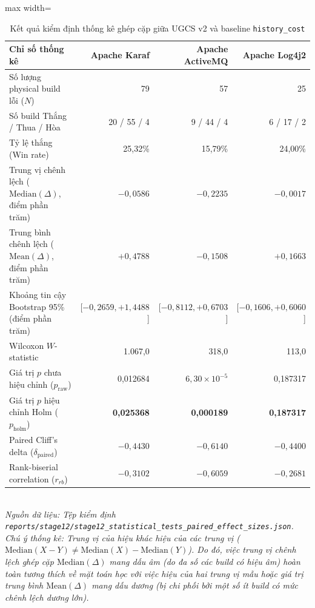 \begin{table}[H]
\centering
\caption{Kết quả kiểm định thống kê ghép cặp giữa UGCS v2 và baseline \texttt{history\_cost}}
\label{tab:stage12_comprehensive}
\begin{adjustbox}{max width=\textwidth}
\small
\begin{tabular}{lrrr}
\toprule
\textbf{Chỉ số thống kê} & \textbf{Apache Karaf} & \textbf{Apache ActiveMQ} & \textbf{Apache Log4j2} \\
\midrule
Số lượng physical build lỗi ($N$) & 79 & 57 & 25 \\
Số build Thắng / Thua / Hòa & 20 / 55 / 4 & 9 / 44 / 4 & 6 / 17 / 2 \\
Tỷ lệ thắng (Win rate) & 25,32\% & 15,79\% & 24,00\% \\
\midrule
Trung vị chênh lệch ($\text{Median}(\Delta)$, điểm phần trăm) & \textbf{$-0,0586$} & \textbf{$-0,2235$} & \textbf{$-0,0017$} \\
Trung bình chênh lệch ($\text{Mean}(\Delta)$, điểm phần trăm)   & \textbf{$+0,4788$} & \textbf{$-0,1508$} & \textbf{$+0,1663$} \\
Khoảng tin cậy Bootstrap 95\% (điểm phần trăm) & [$-0,2659, +1,4488$] & [$-0,8112, +0,6703$] & [$-0,1606, +0,6060$] \\
\midrule
Wilcoxon $W$-statistic & 1.067,0 & 318,0 & 113,0 \\
Giá trị $p$ chưa hiệu chỉnh ($p_{\text{raw}}$) & 0,012684 & $6,30 \times 10^{-5}$ & 0,187317 \\
Giá trị $p$ hiệu chỉnh Holm ($p_{\text{holm}}$) & \textbf{0,025368} & \textbf{0,000189} & \textbf{0,187317} \\
\midrule
Paired Cliff's delta ($\delta_{\text{paired}}$) & \textbf{$-0,4430$} & \textbf{$-0,6140$} & \textbf{$-0,4400$} \\
Rank-biserial correlation ($r_{rb}$) & \textbf{$-0,3102$} & \textbf{$-0,6059$} & \textbf{$-0,2681$} \\
\bottomrule
\end{tabular}
\end{adjustbox}
\vspace{1mm}\\
\footnotesize{\textit{Nguồn dữ liệu: Tệp kiểm định \texttt{reports/stage12/stage12\_statistical\_tests\_paired\_effect\_sizes.json}. Chú ý thống kê: Trung vị của hiệu khác hiệu của các trung vị ($\text{Median}(X - Y) \neq \text{Median}(X) - \text{Median}(Y)$). Do đó, việc trung vị chênh lệch ghép cặp $\text{Median}(\Delta)$ mang dấu âm (do đa số các build có hiệu âm) hoàn toàn tương thích về mặt toán học với việc hiệu của hai trung vị mẫu hoặc giá trị trung bình $\text{Mean}(\Delta)$ mang dấu dương (bị chi phối bởi một số ít build có mức chênh lệch dương lớn).}}
\end{table}

